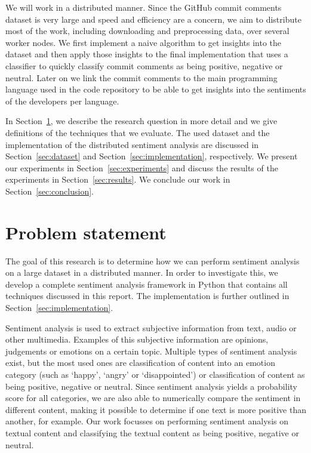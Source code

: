 \documentclass{article}
\begin{document}
We will work in a distributed manner. Since the GitHub commit comments dataset
is very large and speed and efficiency are a concern, we aim to distribute most
of the work, including downloading and preprocessing data, over several worker
nodes. We first implement a naive algorithm to get insights into the dataset and
then apply those insights to the final implementation that uses a classifier
to quickly classify commit comments as being positive, negative or neutral. Later
on we link the commit comments to the main programming language used in the code
repository to be able to get insights into the sentiments of the developers per
language.

In Section~\ref{sec:problem}, we describe the research question in more detail 
and we give definitions of the techniques that we evaluate. The used dataset and
the implementation of the distributed sentiment analysis are discussed in 
Section~\ref{sec:dataset} and Section~\ref{sec:implementation}, respectively. 
We present our experiments in Section~\ref{sec:experiments} and discuss the
results of the experiments in Section~\ref{sec:results}. We conclude our work in
Section~\ref{sec:conclusion}.

\section{Problem statement}\label{sec:problem}
The goal of this research is to determine how we can perform sentiment analysis
on a large dataset in a distributed manner. In order to investigate this, we
develop a complete sentiment analysis framework in Python that contains all
techniques discussed in this report. The implementation is further outlined in 
Section~\ref{sec:implementation}.

Sentiment analysis is used to extract subjective information from text, audio
or other multimedia. Examples of this subjective information are opinions,
judgements or emotions on a certain topic. Multiple types of sentiment analysis
exist, but the most used ones are classification of content into an emotion
category (such as `happy', `angry' or `disappointed') or classification of
content as being positive, negative or neutral. Since sentiment analysis
yields a probability score for all categories, we are also able to numerically
compare the sentiment in different content, making it possible to determine if
one text is more positive than another, for example. Our work focusses on
performing sentiment analysis on textual content and classifying the textual
content as being positive, negative or neutral.
\end{document}
